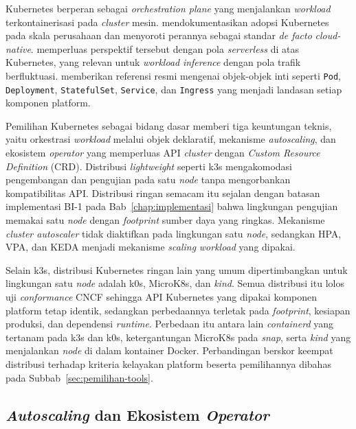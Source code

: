 Kubernetes berperan sebagai \textit{orchestration plane} yang menjalankan \textit{workload} terkontainerisasi pada \textit{cluster} mesin. \textcite{lakka2025kubernetes} mendokumentasikan adopsi Kubernetes pada skala perusahaan dan menyoroti perannya sebagai standar \textit{de facto} \textit{cloud-native}. \textcite{adusumilli2025serverless} memperluas perspektif tersebut dengan pola \textit{serverless} di atas Kubernetes, yang relevan untuk \textit{workload} \textit{inference} dengan pola trafik berfluktuasi. \textcite{kubernetes2024} memberikan referensi resmi mengenai objek-objek inti seperti \texttt{Pod}, \texttt{Deployment}, \texttt{StatefulSet}, \texttt{Service}, dan \texttt{Ingress} yang menjadi landasan setiap komponen platform.

Pemilihan Kubernetes sebagai bidang dasar memberi tiga keuntungan teknis, yaitu orkestrasi \textit{workload} melalui objek deklaratif, mekanisme \textit{autoscaling}, dan ekosistem \textit{operator} yang memperluas API \textit{cluster} dengan \textit{Custom Resource Definition} (CRD). Distribusi \textit{lightweight} seperti k3s mengakomodasi pengembangan dan pengujian pada satu \textit{node} tanpa mengorbankan kompatibilitas API. Distribusi ringan semacam itu sejalan dengan batasan implementasi BI-1 pada Bab~\ref{chap:implementasi} bahwa lingkungan pengujian memakai satu \textit{node} dengan \textit{footprint} sumber daya yang ringkas. Mekanisme \textit{cluster autoscaler} tidak diaktifkan pada lingkungan satu \textit{node}, sedangkan HPA, VPA, dan KEDA menjadi mekanisme \textit{scaling} \textit{workload} yang dipakai.

Selain k3s, distribusi Kubernetes ringan lain yang umum dipertimbangkan untuk lingkungan satu \textit{node} adalah k0s, MicroK8s, dan \textit{kind}. Semua distribusi itu lolos uji \textit{conformance} CNCF \autocite{cncf2026conformance} sehingga API Kubernetes yang dipakai komponen platform tetap identik, sedangkan perbedaannya terletak pada \textit{footprint}, kesiapan produksi, dan dependensi \textit{runtime}. Perbedaan itu antara lain \textit{containerd} yang tertanam pada k3s dan k0s, ketergantungan MicroK8s pada \textit{snap}, serta \textit{kind} yang menjalankan \textit{node} di dalam kontainer Docker. Perbandingan berskor keempat distribusi terhadap kriteria kelayakan platform beserta pemilihannya dibahas pada Subbab~\ref{sec:pemilihan-tools}.



\subsection{\textit{Autoscaling} dan Ekosistem \textit{Operator}}
\label{subsec:k8s-skala-operator}

